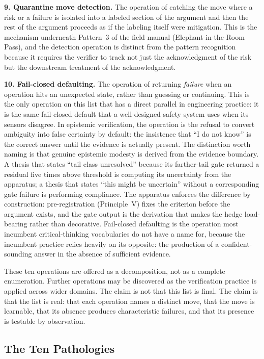 \documentclass[11pt]{article}
\begin{document}
\textbf{9. Quarantine move detection.} The operation of catching the move where a risk or a failure is isolated into a labeled section of the argument and then the rest of the argument proceeds as if the labeling itself were mitigation. This is the mechanism underneath Pattern~3 of the field manual (Elephant-in-the-Room Pass), and the detection operation is distinct from the pattern recognition because it requires the verifier to track not just the acknowledgment of the risk but the downstream treatment of the acknowledgment.

\textbf{10. Fail-closed defaulting.} The operation of returning \emph{failure} when an operation hits an unexpected state, rather than guessing or continuing. This is the only operation on this list that has a direct parallel in engineering practice: it is the same fail-closed default that a well-designed safety system uses when its sensors disagree. In epistemic verification, the operation is the refusal to convert ambiguity into false certainty by default: the insistence that ``I do not know'' is the correct answer until the evidence is actually present. The distinction worth naming is that genuine epistemic modesty is derived from the evidence boundary. A thesis that states ``tail class unresolved'' because its farther-tail gate returned a residual five times above threshold is computing its uncertainty from the apparatus; a thesis that states ``this might be uncertain'' without a corresponding gate failure is performing compliance. The apparatus enforces the difference by construction: pre-registration (Principle~V) fixes the criterion before the argument exists, and the gate output is the derivation that makes the hedge load-bearing rather than decorative. Fail-closed defaulting is the operation most incumbent critical-thinking vocabularies do not have a name for, because the incumbent practice relies heavily on its opposite: the production of a confident-sounding answer in the absence of sufficient evidence.

These ten operations are offered as a decomposition, not as a complete enumeration. Further operations may be discovered as the verification practice is applied across wider domains. The claim is not that this list is final. The claim is that the list is real: that each operation names a distinct move, that the move is learnable, that its absence produces characteristic failures, and that its presence is testable by observation.

\subsection{The Ten Pathologies}
\end{document}
